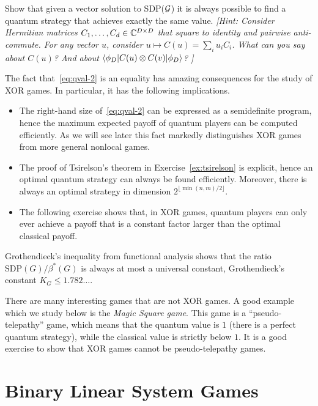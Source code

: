 \begin{exercise}\label{ex:tsirelson}
Show that given a vector solution to SDP($\mathcal{G}$) it is always possible to find a quantum strategy that achieves exactly the same value. \emph{[Hint: Consider Hermitian matrices $C_1,\ldots,C_d \in \mathbb{C}^{D\times D}$ that square to identity and pairwise anti-commute. For any vector $u$, consider $u\mapsto C(u) = \sum_i u_i C_i$. What can you say about $C(u)$? And about $\langle\phi_{D}| C(u) \otimes C(v)|\phi_D\rangle$? ]}
\end{exercise}

The fact that~\eqref{eq:qval-2} is an equality has amazing consequences for the study of XOR games. In particular, it has the following implications. 
\begin{itemize}
  \item The right-hand size of~\eqref{eq:qval-2} can be expressed as a semidefinite program, hence the maximum expected payoff of quantum players can be computed efficiently. As we will see later this fact markedly distinguishes XOR games from more general nonlocal games. 
  \item The proof of Tsirelson's theorem in Exercise~\ref{ex:tsirelson} is explicit, hence an optimal quantum strategy can always be found efficiently. Moreover, there is always an optimal strategy in dimension $2^{\lfloor \min(n,m)/2 \rfloor}$. 
  \item The following exercise shows that, in XOR games, quantum players can only ever achieve a payoff that is a constant factor larger than the optimal classical payoff.
\end{itemize}

\begin{exercise}
Grothendieck's inequality from functional analysis shows that the ratio $\text{SDP}(G)/\beta^*(G)$ is always at most a universal constant, Grothendieck's constant $K_G \leq 1.782\ldots$.
\end{exercise}


\begin{remark}
There are many interesting games that are not XOR games. A good example which we study below is the \emph{Magic Square game}. This game is a ``pseudo-telepathy'' game, which means that the quantum value is $1$ (there is a perfect quantum strategy), while the classical value is strictly below $1$. It is a good exercise to show that XOR games cannot be pseudo-telepathy games.  
\end{remark}

\section{Binary Linear System Games}


